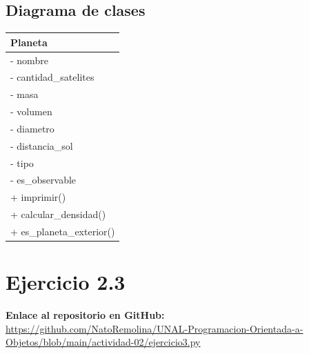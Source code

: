 \documentclass[11pt, a4paper]{article}
\newcommand{\clasebox}[3]{%
\begin{center}
\begin{tabular}{|l|}
\hline
\textbf{#1} \\
\hline
#2
\hline
#3
\hline
\end{tabular}
\end{center}
}
\begin{document}
\subsection{Diagrama de clases}
\clasebox{Planeta}
{%
- nombre \\
- cantidad\_satelites \\
- masa \\
- volumen \\
- diametro \\
- distancia\_sol \\
- tipo \\
- es\_observable \\
}
{%
+ imprimir() \\
+ calcular\_densidad() \\
+ es\_planeta\_exterior() \\
}

\newpage
\section{Ejercicio 2.3}

\noindent \textbf{Enlace al repositorio en GitHub:} \\
\url{https://github.com/NatoRemolina/UNAL-Programacion-Orientada-a-Objetos/blob/main/actividad-02/ejercicio3.py}
\end{document}
